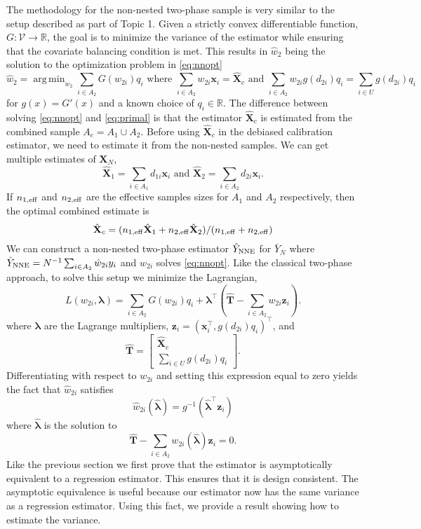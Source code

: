 \documentclass[12pt]{article}
\DeclareMathOperator*{\argmin}{arg\,min}
\renewcommand{\bf}[1]{\mathbf{#1}}
\begin{document}
The methodology for the non-nested two-phase sample is very similar to the setup
described as part of Topic 1. Given a strictly convex differentiable function,
$G: \mathcal{V} \to \mathbb{R}$, the goal is to minimize the variance of the
estimator while ensuring that the covariate balancing condition is met. This
results in $\hat w_2$ being the solution to the optimization problem in 
\eqref{eq:nnopt}
\begin{equation}\label{eq:nnopt}
\hat w_2 = \argmin_{w_2} \sum_{i \in A_2} G\left(w_{2i}\right) q_i 
\text{ where } 
\sum_{i \in A_2} w_{2i} \bf x_i = \hat{\bf X}_{c} \text{ and } 
\sum_{i \in A_2} w_{2i} g(d_{2i}) q_i = \sum_{i \in U} g(d_{2i}) q_i
\end{equation}
for $g(x) = G'(x)$ and a known choice of $q_i \in \mathbb{R}$. 
The difference
between solving \eqref{eq:nnopt} and \eqref{eq:primal} is that the
estimator $\hat{\bf X}_c$ is estimated from the combined sample $A_c = A_1 \cup
A_2$. Before using $\hat{\bf X}_c$ in the debiased calibration estimator, we
need to estimate it from the non-nested samples. We can get multiple estimates
of $\bf X_N$, 
$$
\hat{\bf X}_1 = \sum_{i \in A_1} d_{1i} \bf x_i \text{ and }
\hat{\bf X}_2 = \sum_{i \in A_2} d_{2i} \bf x_i.
$$
If $n_{1, \rm{eff}}$ and $n_{2, \rm{eff}}$ are the effective samples sizes for
$A_1$ and $A_2$ respectively, then the optimal combined estimate is 
$$
\hat{\bf X}_c = (n_{1, \rm{eff}} \hat{\bf X}_1 + n_{2, \rm{eff}}\hat{\bf X}_2) / 
(n_{1, \rm{eff}} + n_{2, \rm{eff}})
$$
We can construct a non-nested two-phase estimator $\hat Y_{\rm NNE}$ for 
$\bar Y_N$ where
$\hat Y_{\rm NNE} = N^{-1} \sum_{i \in A_2} \hat w_{2i} y_i$ and $\hat w_{2i}$
solves \eqref{eq:nnopt}. Like the classical two-phase approach, to solve this
setup we minimize the Lagrangian,
\begin{equation}\label{eq:legragedc2}
  L(w_{2i}, \bm \lambda) = \sum_{i \in A_2} G(w_{2i}) q_i + 
  \bm \lambda^\top \left( \hat{\bf T} - \sum_{i \in A_2} w_{2i} \bf z_i \right).
\end{equation}
where $\bm \lambda$ are the Lagrange multipliers, $\bf{z}_i = (\bf{x}_i^\top, g(d_{2i})q_i)^\top$,
and
$$\hat{\bf T} = 
\begin{bmatrix}
\hat{\bf X}_c \\ \sum_{i \in U} g(d_{2i}) q_i
\end{bmatrix}.
$$
Differentiating with respect to $w_{2i}$ and setting this expression equal to
zero yields the fact that $\hat w_{2i}$ satisfies 
$$ \hat w_{2i}(\hat{\bm \lambda}) = g^{-1}(\hat{\bm \lambda}^\top \bf z_i) $$
where $\hat{\bm \lambda}$ is the solution to
\begin{equation}\label{eq:lamdc2}
  \hat{\bf T} - \sum_{i \in A_2} w_{2i}(\hat{\bm \lambda}) \bf z_i = 0.
\end{equation}
Like the previous section we first prove that the estimator is 
asymptotically equivalent to a regression estimator. This ensures that it is
design consistent. The asymptotic equivalence is useful because our estimator
now has the same variance as a regression estimator. Using this fact,
we provide a result showing how to estimate the variance.
\end{document}
